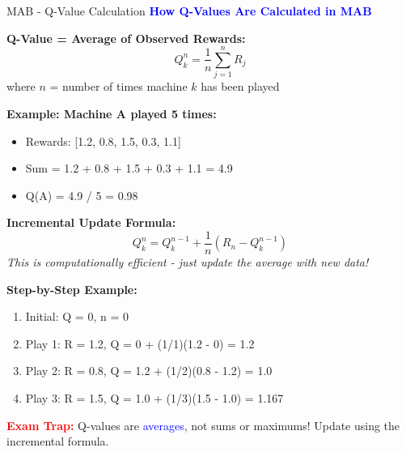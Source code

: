 \documentclass[8pt]{beamer}
\begin{document}
	\begin{frame}{MAB - Q-Value Calculation}
		\fontsize{6.5}{7.5}\selectfont
		\textcolor{blue}{\textbf{How Q-Values Are Calculated in MAB}}
		
		\textbf{Q-Value = Average of Observed Rewards:}
		\[
		Q_k^n = \frac{1}{n}\sum_{j=1}^n R_j
		\]
		where $n$ = number of times machine $k$ has been played
		
		\textbf{Example: Machine A played 5 times:}
		\begin{itemize}
			\item Rewards: [1.2, 0.8, 1.5, 0.3, 1.1]
			\item Sum = 1.2 + 0.8 + 1.5 + 0.3 + 1.1 = 4.9
			\item Q(A) = 4.9 / 5 = 0.98
		\end{itemize}
		
		\textbf{Incremental Update Formula:}
		\[
		Q_k^n = Q_k^{n-1} + \frac{1}{n}(R_n - Q_k^{n-1})
		\]
		\textit{This is computationally efficient - just update the average with new data!}
		
		\textbf{Step-by-Step Example:}
		\begin{enumerate}
			\item Initial: Q = 0, n = 0
			\item Play 1: R = 1.2, Q = 0 + (1/1)(1.2 - 0) = 1.2
			\item Play 2: R = 0.8, Q = 1.2 + (1/2)(0.8 - 1.2) = 1.0
			\item Play 3: R = 1.5, Q = 1.0 + (1/3)(1.5 - 1.0) = 1.167
		\end{enumerate}
		
		\textcolor{red}{\textbf{Exam Trap:}} Q-values are \textcolor{blue}{averages}, not sums or maximums! Update using the incremental formula.
	\end{frame}
	
\end{document}
